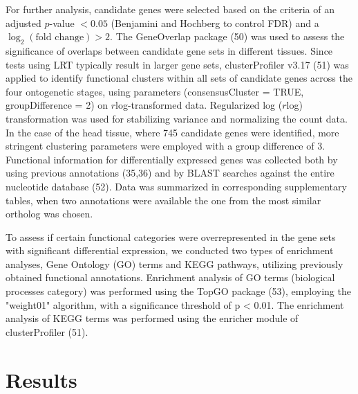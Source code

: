 \documentclass[lineno]{wiley-article}
\begin{document}
For further analysis, candidate genes were selected based on the criteria of an adjusted \( p \)-value \( < 0.05 \) (Benjamini and Hochberg to control FDR) and a \(\log_2(\text{fold change}) > 2\). The GeneOverlap package (50) was used to assess the significance of overlaps between candidate gene sets in different tissues. Since tests using LRT typically result in larger gene sets, clusterProfiler v3.17 (51) was applied to identify functional clusters within all sets of candidate genes across the four ontogenetic stages, using parameters (consensusCluster = TRUE, groupDifference = 2) on \( r \)log-transformed data. Regularized log (\( r \)log) transformation was used for stabilizing variance and normalizing the count data. In the case of the head tissue, where 745 candidate genes were identified, more stringent clustering parameters were employed with a group difference of 3. Functional information for differentially expressed genes was collected both by using previous annotations (35,36) and by BLAST searches against the entire nucleotide database (52). Data was summarized in corresponding supplementary tables, when two annotations were available the one from the most similar ortholog was chosen.

To assess if certain functional categories were overrepresented in the gene sets with significant differential expression, we conducted two types of enrichment analyses, Gene Ontology (GO) terms and KEGG pathways, utilizing previously obtained functional annotations. Enrichment analysis of GO terms (biological processes category) was performed using the TopGO package (53), employing the "weight01" algorithm, with a significance threshold of p < 0.01. The enrichment analysis of KEGG terms was performed using the enricher module of clusterProfiler (51).

\section{Results}
\end{document}
